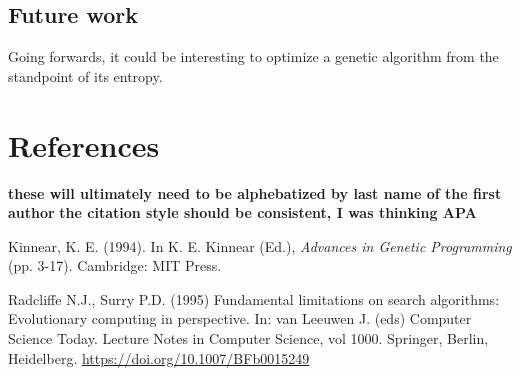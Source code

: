 \documentclass[11pt]{article}
\begin{document}
\subsection{Future work}
\label{sec:org0f04af1}
Going forwards, it could be interesting to optimize a genetic algorithm from the standpoint of its entropy.

\section{References}
\label{sec:org9dc046e}
\textbf{these will ultimately need to be alphebatized by last name of the first author} \textbf{the citation style should be consistent, I was thinking APA}

Kinnear, K. E. (1994). In K. E. Kinnear (Ed.), \emph{Advances in Genetic Programming} (pp. 3-17). Cambridge: MIT Press.

Radcliffe N.J., Surry P.D. (1995) Fundamental limitations on search algorithms: Evolutionary computing in perspective.
In: van Leeuwen J. (eds) Computer Science Today. Lecture Notes in Computer Science, vol 1000. Springer, Berlin, Heidelberg.
\url{https://doi.org/10.1007/BFb0015249}
\end{document}
